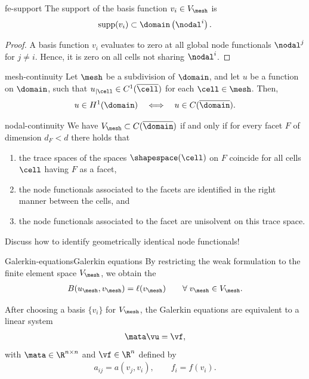 \begin{Lemma}{fe-support}
  The support of the basis function $v_i\in V_\mesh$ is
  \begin{gather*}
    \operatorname{supp}(v_i) \subset \domain\left(\nodal^i\right).
  \end{gather*}
\end{Lemma}

\begin{proof}
  A basis function $v_i$ evaluates to zero at all global node
  functionals $\nodal^j$ for $j\neq i$. Hence, it is zero on all cells
  not sharing $\nodal^i$.
\end{proof}

\begin{Lemma}{mesh-continuity}
  Let $\mesh$ be a subdivision of $\domain$, and let $u$ be a function
  on $\domain$, such that $u_{|\cell} \in C^1(\overline{\cell})$ for
  each $\cell\in\mesh$. Then,
  \begin{gather}
    u\in H^1(\domain)
    \quad \Longleftrightarrow\quad
    u\in C(\overline\domain).
  \end{gather}
\end{Lemma}

\begin{Lemma}{nodal-continuity}
  We have $V_\mesh\subset C(\overline{\domain})$ if and only if for
  every facet $F$ of dimension $d_F < d$ there holds that
  \begin{enumerate}
  \item the trace spaces of the spaces $\shapespace(\cell)$ on $F$ coincide
    for all cells $\cell$ having $F$ as a facet,
  \item the node functionals associated to the facets are identified
    in the right manner between the cells, and
  \item the node functionals associated to the facet are unisolvent on
    this trace space.
  \end{enumerate}
\end{Lemma}

\begin{todo}
  Discuss how to identify geometrically identical node functionals!
\end{todo}

\begin{Definition}{Galerkin-equations}{Galerkin equations}
  By restricting the weak formulation to the finite element space $V_{\mesh}$, we obtain the 
  \begin{gather}
    B(u_{\mesh},v_{\mesh}) = \ell(v_{\mesh}) \qquad\forall\;v_{\mesh}\in V_{\mesh}. 
  \end{gather}
  
  After choosing a basis $\{v_i\}$ for $V_{\mesh}$, the Galerkin equations are
  equivalent to a linear system
  \begin{gather}
    \mata \vu = \vf,
  \end{gather}
  with $\mata\in\R^{n\times n}$ and $\vf\in \R^n$ defined by
  \begin{gather}
    a_{ij} = a(v_j, v_i), \qquad f_i = f(v_i).
  \end{gather}
\end{Definition}

